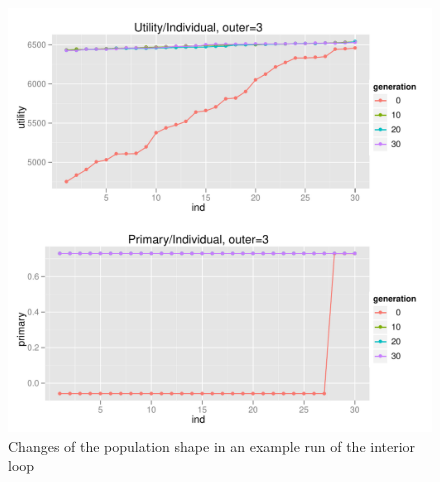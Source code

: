 \begin{figure}
  \centering
  \includegraphics[width=1\textwidth]{exp/uncert/pres_utilind_03}
  \caption{Changes of the population shape in an example run of the interior
    loop}
  \label{pres_utilind_03}
\end{figure}

